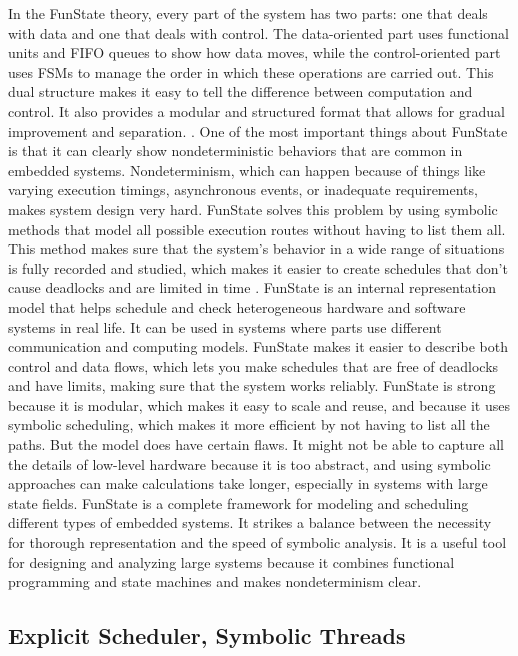 \documentclass[conference]{IEEEtran}
\begin{document}
 In the FunState theory, every part of the system has two parts: one that deals with data and one that deals with control.  The data-oriented part uses functional units and FIFO queues to show how data moves, while the control-oriented part uses FSMs to manage the order in which these operations are carried out.  This dual structure makes it easy to tell the difference between computation and control. It also provides a modular and structured format that allows for gradual improvement and separation. \cite {strehl1999scheduling}.
 One of the most important things about FunState is that it can clearly show nondeterministic behaviors that are common in embedded systems.  Nondeterminism, which can happen because of things like varying execution timings, asynchronous events, or inadequate requirements, makes system design very hard.  FunState solves this problem by using symbolic methods that model all possible execution routes without having to list them all.  This method makes sure that the system's behavior in a wide range of situations is fully recorded and studied, which makes it easier to create schedules that don't cause deadlocks and are limited in time \cite{strehl1999scheduling}.
 FunState is an internal representation model that helps schedule and check heterogeneous hardware and software systems in real life.  It can be used in systems where parts use different communication and computing models.  FunState makes it easier to describe both control and data flows, which lets you make schedules that are free of deadlocks and have limits, making sure that the system works reliably. FunState is strong because it is modular, which makes it easy to scale and reuse, and because it uses symbolic scheduling, which makes it more efficient by not having to list all the paths.  But the model does have certain flaws.  It might not be able to capture all the details of low-level hardware because it is too abstract, and using symbolic approaches can make calculations take longer, especially in systems with large state fields. FunState is a complete framework for modeling and scheduling different types of embedded systems. It strikes a balance between the necessity for thorough representation and the speed of symbolic analysis.  It is a useful tool for designing and analyzing large systems because it combines functional programming and state machines and makes nondeterminism clear.

 \subsection{Explicit Scheduler, Symbolic Threads }
 
\end{document}
